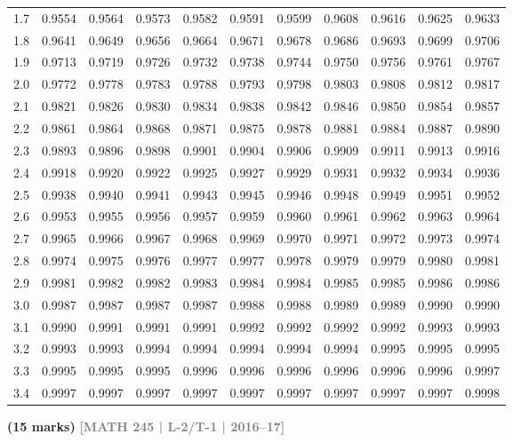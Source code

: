 \documentclass[12pt,a4paper]{article}
\newcommand{\yr}[1]{\hfill\textcolor{gray}{\small\textbf{[#1]}}}
\newcommand{\mk}[1]{\textcolor{orange!70!black}{\small\textbf{(#1 marks)}}}
\begin{document}
\begin{enumerate}
\begin{center}
\begin{longtable}{ccccccccccc}
1.7 & 0.9554 & 0.9564 & 0.9573 & 0.9582 & 0.9591 & 0.9599 & 0.9608 & 0.9616 & 0.9625 & 0.9633 \\
1.8 & 0.9641 & 0.9649 & 0.9656 & 0.9664 & 0.9671 & 0.9678 & 0.9686 & 0.9693 & 0.9699 & 0.9706 \\
1.9 & 0.9713 & 0.9719 & 0.9726 & 0.9732 & 0.9738 & 0.9744 & 0.9750 & 0.9756 & 0.9761 & 0.9767 \\
2.0 & 0.9772 & 0.9778 & 0.9783 & 0.9788 & 0.9793 & 0.9798 & 0.9803 & 0.9808 & 0.9812 & 0.9817 \\
2.1 & 0.9821 & 0.9826 & 0.9830 & 0.9834 & 0.9838 & 0.9842 & 0.9846 & 0.9850 & 0.9854 & 0.9857 \\
2.2 & 0.9861 & 0.9864 & 0.9868 & 0.9871 & 0.9875 & 0.9878 & 0.9881 & 0.9884 & 0.9887 & 0.9890 \\
2.3 & 0.9893 & 0.9896 & 0.9898 & 0.9901 & 0.9904 & 0.9906 & 0.9909 & 0.9911 & 0.9913 & 0.9916 \\
2.4 & 0.9918 & 0.9920 & 0.9922 & 0.9925 & 0.9927 & 0.9929 & 0.9931 & 0.9932 & 0.9934 & 0.9936 \\
2.5 & 0.9938 & 0.9940 & 0.9941 & 0.9943 & 0.9945 & 0.9946 & 0.9948 & 0.9949 & 0.9951 & 0.9952 \\
2.6 & 0.9953 & 0.9955 & 0.9956 & 0.9957 & 0.9959 & 0.9960 & 0.9961 & 0.9962 & 0.9963 & 0.9964 \\
2.7 & 0.9965 & 0.9966 & 0.9967 & 0.9968 & 0.9969 & 0.9970 & 0.9971 & 0.9972 & 0.9973 & 0.9974 \\
2.8 & 0.9974 & 0.9975 & 0.9976 & 0.9977 & 0.9977 & 0.9978 & 0.9979 & 0.9979 & 0.9980 & 0.9981 \\
2.9 & 0.9981 & 0.9982 & 0.9982 & 0.9983 & 0.9984 & 0.9984 & 0.9985 & 0.9985 & 0.9986 & 0.9986 \\
3.0 & 0.9987 & 0.9987 & 0.9987 & 0.9987 & 0.9988 & 0.9988 & 0.9989 & 0.9989 & 0.9990 & 0.9990 \\
3.1 & 0.9990 & 0.9991 & 0.9991 & 0.9991 & 0.9992 & 0.9992 & 0.9992 & 0.9992 & 0.9993 & 0.9993 \\
3.2 & 0.9993 & 0.9993 & 0.9994 & 0.9994 & 0.9994 & 0.9994 & 0.9994 & 0.9995 & 0.9995 & 0.9995 \\
3.3 & 0.9995 & 0.9995 & 0.9995 & 0.9996 & 0.9996 & 0.9996 & 0.9996 & 0.9996 & 0.9996 & 0.9997 \\
3.4 & 0.9997 & 0.9997 & 0.9997 & 0.9997 & 0.9997 & 0.9997 & 0.9997 & 0.9997 & 0.9997 & 0.9998 \\
\end{longtable}
\end{center}

\mk{15} \yr{MATH 245 | L-2/T-1 | 2016--17}

\end{enumerate}
\end{document}

